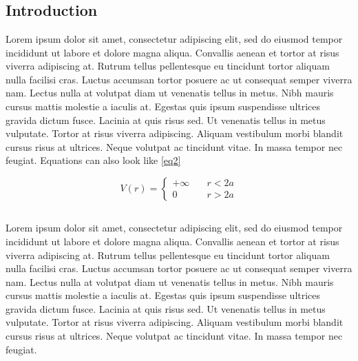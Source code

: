 \chapter{}\label{chap:intro}




%





\section{Introduction}
Lorem ipsum dolor sit amet, consectetur adipiscing elit, sed do eiusmod tempor incididunt ut labore et dolore magna aliqua. Convallis aenean et tortor at risus viverra adipiscing at. Rutrum tellus pellentesque eu tincidunt tortor aliquam nulla facilisi cras. Luctus accumsan tortor posuere ac ut consequat semper viverra nam. Lectus nulla at volutpat diam ut venenatis tellus in metus. Nibh mauris cursus mattis molestie a iaculis at. Egestas quis ipsum suspendisse ultrices gravida dictum fusce. Lacinia at quis risus sed. Ut venenatis tellus in metus vulputate. Tortor at risus viverra adipiscing. Aliquam vestibulum morbi blandit cursus risus at ultrices. Neque volutpat ac tincidunt vitae. In massa tempor nec feugiat.
Equations can also look like \ref{eq2}

\begin{equation}
\label{eq2}
V(r) = \left\{
\begin{array}{ll}
+\infty & \quad r < 2a \\
0 & \quad r > 2a
\end{array}
\right.
\end{equation}

\section{}
Lorem ipsum dolor sit amet, consectetur adipiscing elit, sed do eiusmod tempor incididunt ut labore et dolore magna aliqua. Convallis aenean et tortor at risus viverra adipiscing at. Rutrum tellus pellentesque eu tincidunt tortor aliquam nulla facilisi cras. Luctus accumsan tortor posuere ac ut consequat semper viverra nam. Lectus nulla at volutpat diam ut venenatis tellus in metus. Nibh mauris cursus mattis molestie a iaculis at. Egestas quis ipsum suspendisse ultrices gravida dictum fusce. Lacinia at quis risus sed. Ut venenatis tellus in metus vulputate. Tortor at risus viverra adipiscing. Aliquam vestibulum morbi blandit cursus risus at ultrices. Neque volutpat ac tincidunt vitae. In massa tempor nec feugiat.

